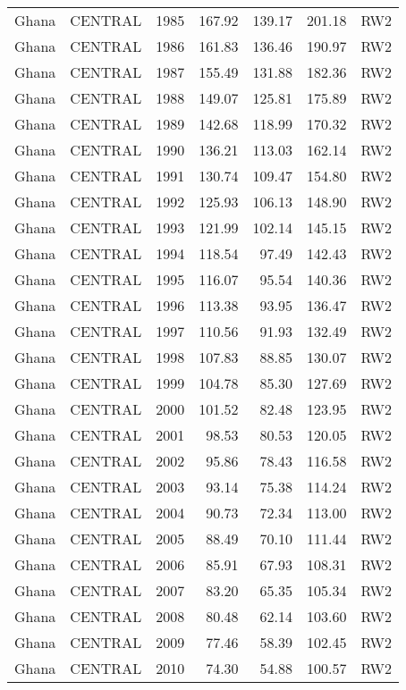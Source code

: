 \begin{longtable}{lllrrrl}
  Ghana & CENTRAL & 1985 & 167.92 & 139.17 & 201.18 & RW2 \\ 
  Ghana & CENTRAL & 1986 & 161.83 & 136.46 & 190.97 & RW2 \\ 
  Ghana & CENTRAL & 1987 & 155.49 & 131.88 & 182.36 & RW2 \\ 
  Ghana & CENTRAL & 1988 & 149.07 & 125.81 & 175.89 & RW2 \\ 
  Ghana & CENTRAL & 1989 & 142.68 & 118.99 & 170.32 & RW2 \\ 
  Ghana & CENTRAL & 1990 & 136.21 & 113.03 & 162.14 & RW2 \\ 
  Ghana & CENTRAL & 1991 & 130.74 & 109.47 & 154.80 & RW2 \\ 
  Ghana & CENTRAL & 1992 & 125.93 & 106.13 & 148.90 & RW2 \\ 
  Ghana & CENTRAL & 1993 & 121.99 & 102.14 & 145.15 & RW2 \\ 
  Ghana & CENTRAL & 1994 & 118.54 & 97.49 & 142.43 & RW2 \\ 
  Ghana & CENTRAL & 1995 & 116.07 & 95.54 & 140.36 & RW2 \\ 
  Ghana & CENTRAL & 1996 & 113.38 & 93.95 & 136.47 & RW2 \\ 
  Ghana & CENTRAL & 1997 & 110.56 & 91.93 & 132.49 & RW2 \\ 
  Ghana & CENTRAL & 1998 & 107.83 & 88.85 & 130.07 & RW2 \\ 
  Ghana & CENTRAL & 1999 & 104.78 & 85.30 & 127.69 & RW2 \\ 
  Ghana & CENTRAL & 2000 & 101.52 & 82.48 & 123.95 & RW2 \\ 
  Ghana & CENTRAL & 2001 & 98.53 & 80.53 & 120.05 & RW2 \\ 
  Ghana & CENTRAL & 2002 & 95.86 & 78.43 & 116.58 & RW2 \\ 
  Ghana & CENTRAL & 2003 & 93.14 & 75.38 & 114.24 & RW2 \\ 
  Ghana & CENTRAL & 2004 & 90.73 & 72.34 & 113.00 & RW2 \\ 
  Ghana & CENTRAL & 2005 & 88.49 & 70.10 & 111.44 & RW2 \\ 
  Ghana & CENTRAL & 2006 & 85.91 & 67.93 & 108.31 & RW2 \\ 
  Ghana & CENTRAL & 2007 & 83.20 & 65.35 & 105.34 & RW2 \\ 
  Ghana & CENTRAL & 2008 & 80.48 & 62.14 & 103.60 & RW2 \\ 
  Ghana & CENTRAL & 2009 & 77.46 & 58.39 & 102.45 & RW2 \\ 
  Ghana & CENTRAL & 2010 & 74.30 & 54.88 & 100.57 & RW2 \\ 

\end{longtable}

